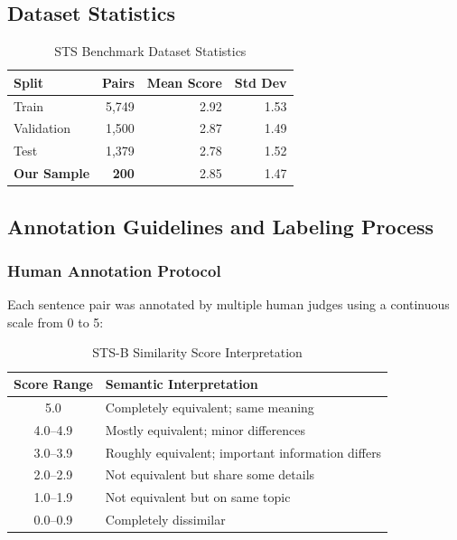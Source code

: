 \documentclass[11pt,a4paper]{article}
\begin{document}
\subsection{Dataset Statistics}

\begin{table}[h]
\centering
\caption{STS Benchmark Dataset Statistics}
\begin{tabular}{lrrr}
\toprule
\textbf{Split} & \textbf{Pairs} & \textbf{Mean Score} & \textbf{Std Dev} \\
\midrule
Train & 5,749 & 2.92 & 1.53 \\
Validation & 1,500 & 2.87 & 1.49 \\
Test & 1,379 & 2.78 & 1.52 \\
\midrule
\textbf{Our Sample} & \textbf{200} & 2.85 & 1.47 \\
\bottomrule
\end{tabular}
\label{tab:dataset_stats}
\end{table}

\subsection{Annotation Guidelines and Labeling Process}

\subsubsection{Human Annotation Protocol}

Each sentence pair was annotated by multiple human judges using a continuous scale from 0 to 5:

\begin{table}[h]
\centering
\caption{STS-B Similarity Score Interpretation}
\begin{tabular}{cl}
\toprule
\textbf{Score Range} & \textbf{Semantic Interpretation} \\
\midrule
5.0 & Completely equivalent; same meaning \\
4.0--4.9 & Mostly equivalent; minor differences \\
3.0--3.9 & Roughly equivalent; important information differs \\
2.0--2.9 & Not equivalent but share some details \\
1.0--1.9 & Not equivalent but on same topic \\
0.0--0.9 & Completely dissimilar \\
\bottomrule
\end{tabular}
\label{tab:score_interpretation}
\end{table}
\end{document}
